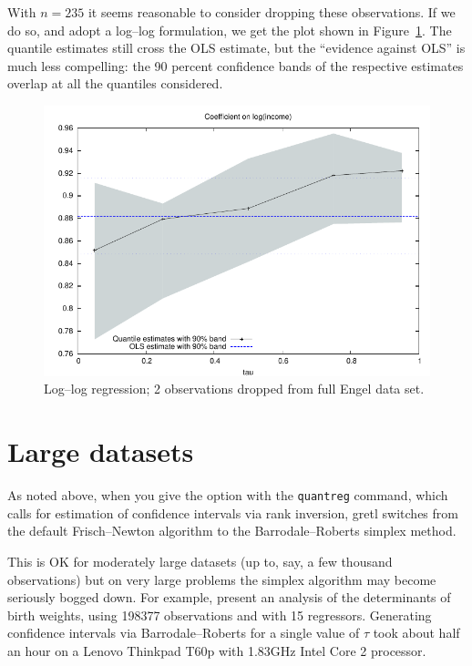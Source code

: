 With $n = 235$ it seems reasonable to consider dropping these
observations.  If we do so, and adopt a log--log formulation, we get
the plot shown in Figure~\ref{fig:tau2}.  The quantile estimates still
cross the OLS estimate, but the ``evidence against OLS'' is much less
compelling: the 90 percent confidence bands of the respective
estimates overlap at all the quantiles considered.

\begin{figure}
  \centering
  \includegraphics{figures/tau-sequence2}
  \caption{Log--log regression; 2 observations dropped from full Engel data
    set.}
  \label{fig:tau2}
\end{figure}


\section{Large datasets}
\label{sec:bigdata}

As noted above, when you give the  option with the
\texttt{quantreg} command, which calls for estimation of confidence
intervals via rank inversion, gretl switches from the default
Frisch--Newton algorithm to the Barrodale--Roberts simplex method.

This is OK for moderately large datasets (up to, say, a few thousand
observations) but on very large problems the simplex algorithm may
become seriously bogged down.  For example, \cite{koenker-hallock01}
present an analysis of the determinants of birth weights, using 
198377 observations and with 15 regressors.  Generating confidence
intervals via Barrodale--Roberts for a single value of $\tau$ took
about half an hour on a Lenovo Thinkpad T60p with 1.83GHz Intel Core 2
processor.

